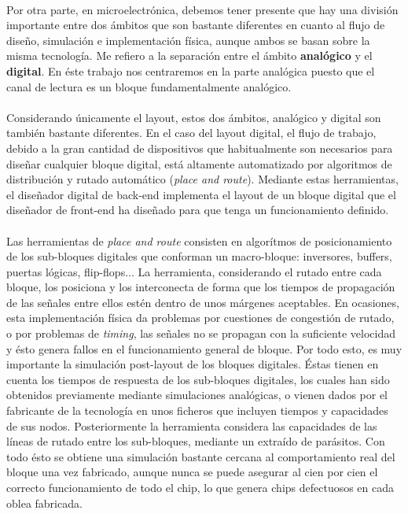\paragraph{}
Por otra parte, en microelectrónica, debemos tener presente que
hay una división importante entre dos ámbitos que son bastante diferentes en cuanto
al flujo de diseño, simulación e implementación física, aunque ambos se basan sobre
la misma tecnología. Me refiero a la separación entre el ámbito \textbf{analógico}
y el \textbf{digital}. En éste trabajo nos centraremos en la parte analógica
puesto que el canal de lectura es un bloque fundamentalmente analógico.

\paragraph{}
Considerando únicamente el layout, estos dos ámbitos, analógico y
digital son también bastante diferentes. En el caso del layout digital, el flujo
de trabajo, debido a la gran cantidad de dispositivos que habitualmente son necesarios
para diseñar cualquier bloque digital, está altamente automatizado por algoritmos
de distribución y rutado automático (\textit{place and route}). Mediante estas
herramientas, el diseñador digital de back-end implementa el layout de un bloque
digital que el diseñador de front-end ha diseñado para que tenga un funcionamiento
definido.

\paragraph{}
Las herramientas de \textit{place and route} consisten en algorítmos
de posicionamiento de los sub-bloques digitales que conforman un macro-bloque:
inversores, buffers, puertas lógicas, flip-flops... La herramienta, considerando el
rutado entre cada bloque, los posiciona y los interconecta de forma que los tiempos
de propagación de las señales entre ellos estén dentro de unos márgenes aceptables.
En ocasiones, esta implementación física da problemas por cuestiones de congestión
de rutado, o por problemas de \textit{timing}, las señales no se propagan con la
suficiente velocidad y ésto genera fallos en el funcionamiento general de bloque.
Por todo esto, es muy importante la simulación post-layout de los bloques digitales.
Éstas tienen en cuenta los tiempos de respuesta de los sub-bloques digitales, los cuales
han sido obtenidos previamente mediante simulaciones analógicas, o vienen dados por
el fabricante de la tecnología en unos ficheros que incluyen tiempos y capacidades de
sus nodos. Posteriormente la herramienta considera las capacidades de las líneas de
rutado entre los sub-bloques, mediante un extraído de parásitos. Con todo ésto
se obtiene una simulación bastante cercana al comportamiento real del bloque una vez
fabricado, aunque nunca se puede asegurar al cien por cien el correcto funcionamiento
de todo el chip, lo que genera chips defectuosos en cada oblea fabricada.


